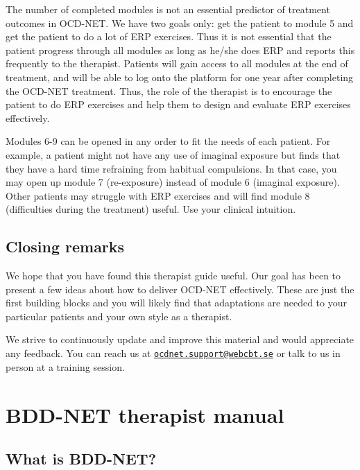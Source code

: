 \documentclass[]{book}
\theoremstyle{definition}
\theoremstyle{definition}
\theoremstyle{definition}
\theoremstyle{remark}
\begin{document}
The number of completed modules is not an essential predictor of
treatment outcomes in OCD-NET. We have two goals only: get the patient
to module 5 and get the patient to do a lot of ERP exercises. Thus it is
not essential that the patient progress through all modules as long as
he/she does ERP and reports this frequently to the therapist. Patients
will gain access to all modules at the end of treatment, and will be
able to log onto the platform for one year after completing the OCD-NET
treatment. Thus, the role of the therapist is to encourage the patient
to do ERP exercises and help them to design and evaluate ERP exercises
effectively.

Modules 6-9 can be opened in any order to fit the needs of each patient.
For example, a patient might not have any use of imaginal exposure but
finds that they have a hard time refraining from habitual compulsions.
In that case, you may open up module 7 (re-exposure) instead of module 6
(imaginal exposure). Other patients may struggle with ERP exercises and
will find module 8 (difficulties during the treatment) useful. Use your
clinical intuition.

\hypertarget{closing-remarks}{%
\section{Closing remarks}\label{closing-remarks}}

We hope that you have found this therapist guide useful. Our goal has
been to present a few ideas about how to deliver OCD-NET effectively.
These are just the first building blocks and you will likely find that
adaptations are needed to your particular patients and your own style as
a therapist.

We strive to continuously update and improve this material and would
appreciate any feedback. You can reach us at
\href{mailto:ocdnet.support@webcbt.se}{\nolinkurl{ocdnet.support@webcbt.se}}
or talk to us in person at a training session.

\hypertarget{bdd-net-therapist-manual}{%
\chapter{BDD-NET therapist manual}\label{bdd-net-therapist-manual}}

\hypertarget{what-is-bdd-net}{%
\section{What is BDD-NET?}\label{what-is-bdd-net}}
\end{document}
